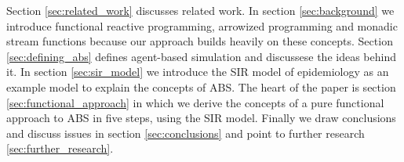 Section \ref{sec:related_work} discusses related work. In section \ref{sec:background} we introduce functional reactive programming, arrowized programming and monadic stream functions because our approach builds heavily on these concepts. Section \ref{sec:defining_abs} defines agent-based simulation and discussese the ideas behind it. In section \ref{sec:sir_model} we introduce the SIR model of epidemiology as an example model to explain the concepts of ABS. The heart of the paper is section \ref{sec:functional_approach} in which we derive the concepts of a pure functional approach to ABS in five steps, using the SIR model. Finally we draw conclusions and discuss issues in section \ref{sec:conclusions} and point to further research \ref{sec:further_research}.

